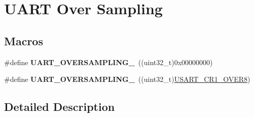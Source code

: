 \hypertarget{group___u_a_r_t___over___sampling}{}\section{U\+A\+RT Over Sampling}
\label{group___u_a_r_t___over___sampling}
\subsection*{Macros}
\begin{DoxyCompactItemize}
\item 
\#define {\bfseries U\+A\+R\+T\+\_\+\+O\+V\+E\+R\+S\+A\+M\+P\+L\+I\+N\+G\+\_}~((uint32\+\_\+t)0x00000000)\hypertarget{group___u_a_r_t___over___sampling_gaa6a320ec65d248d76f21de818db1a2f0}{}\label{group___u_a_r_t___over___sampling_gaa6a320ec65d248d76f21de818db1a2f0}

\item 
\#define {\bfseries U\+A\+R\+T\+\_\+\+O\+V\+E\+R\+S\+A\+M\+P\+L\+I\+N\+G\+\_}~((uint32\+\_\+t)\hyperlink{group___peripheral___registers___bits___definition_gaed6caeb0cb48f1a7b34090f31a92a8e2}{U\+S\+A\+R\+T\+\_\+\+C\+R1\+\_\+\+O\+V\+E\+R8})\hypertarget{group___u_a_r_t___over___sampling_gaeb13896e8bdc1bb041e01a86a868ee0b}{}\label{group___u_a_r_t___over___sampling_gaeb13896e8bdc1bb041e01a86a868ee0b}

\end{DoxyCompactItemize}


\subsection{Detailed Description}
